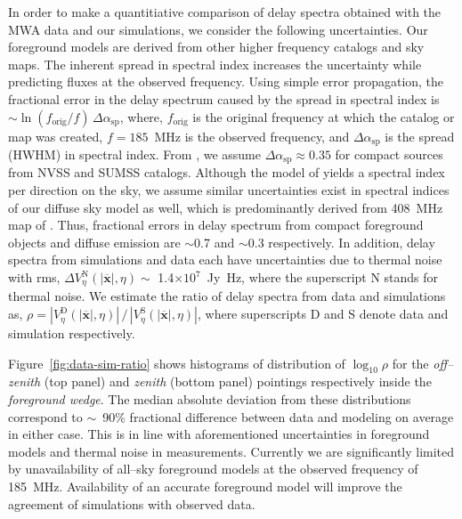 \documentclass[preprint2,iop,numberedappendix]{emulateapj}
\begin{document}
In order to make a quantitiative comparison of delay spectra obtained with the MWA data and our simulations, we consider the following uncertainties. Our foreground models are derived from other higher frequency catalogs and sky maps. The inherent spread in spectral index increases the uncertainty while predicting fluxes at the observed frequency. Using simple error propagation, the fractional error in the delay spectrum caused by the spread in spectral index is $\sim \ln(f_\textrm{orig}/f)\,\Delta\alpha_\textrm{sp}$, where, $f_\textrm{orig}$ is the original frequency at which the catalog or map was created, $f=185$~MHz is the observed frequency, and $\Delta\alpha_\textrm{sp}$ is the spread (HWHM) in spectral index. From \citet{mau03}, we assume $\Delta\alpha_\textrm{sp} \approx 0.35$ for compact sources from NVSS and SUMSS catalogs. Although the model of \citet{deo08} yields a spectral index per direction on the sky, we assume similar uncertainties exist in spectral indices of our diffuse sky model as well, which is predominantly derived from 408~MHz map of \citet{has82}. Thus, fractional errors in delay spectrum from compact foreground objects and diffuse emission are $\sim$0.7 and $\sim$0.3 respectively. In addition, delay spectra from simulations and data each have uncertainties due to thermal noise with rms, $\Delta V^\textrm{N}_\eta(|\overline{\mathbf{x}}|,\eta) \sim$ 1.4$\times 10^7$~Jy~Hz, where the superscript N stands for thermal noise. We estimate the ratio of delay spectra from data and simulations as, $\rho = |V^\textrm{D}_\eta(|\overline{\mathbf{x}}|,\eta)|\,/\,|V^\textrm{S}_\eta(|\overline{\mathbf{x}}|,\eta)|$, where superscripts D and S denote data and simulation respectively. 

Figure~\ref{fig:data-sim-ratio} shows histograms of distribution of $\log_{10}\rho$ for the {\it off--zenith} (top panel) and {\it zenith} (bottom panel) pointings respectively inside the {\it foreground wedge}. The median absolute deviation from these distributions correspond to $\sim$~90\% fractional difference between data and modeling on average in either case. This is in line with aforementioned uncertainties in foreground models and thermal noise in measurements. Currently we are significantly limited by unavailability of all--sky foreground models at the observed frequency of 185~MHz. Availability of an accurate foreground model will improve the agreement of simulations with observed data. 
\end{document}
